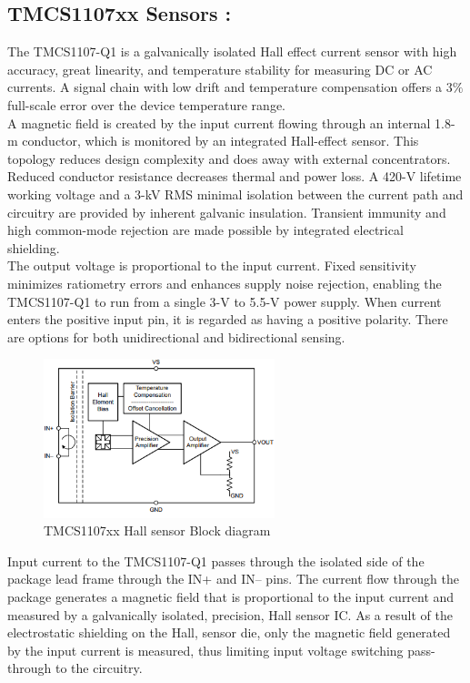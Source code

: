 \subsection{TMCS1107xx Sensors :}
The TMCS1107-Q1 is a galvanically isolated Hall effect current sensor with high accuracy, great linearity, and temperature stability for measuring DC or AC currents. A signal chain with low drift and temperature compensation offers a $3\%$ full-scale error over the device temperature range.\\
A magnetic field is created by the input current flowing through an internal 1.8-m conductor, which is monitored by an integrated Hall-effect sensor. This topology reduces design complexity and does away with external concentrators. Reduced conductor resistance decreases thermal and power loss. A 420-V lifetime working voltage and a 3-kV RMS minimal isolation between the current path and circuitry are provided by inherent galvanic insulation. Transient immunity and high common-mode rejection are made possible by integrated electrical shielding. \\
The output voltage is proportional to the input current. Fixed sensitivity minimizes ratiometry errors and enhances supply noise rejection, enabling the TMCS1107-Q1 to run from a single 3-V to 5.5-V power supply. When current enters the positive input pin, it is regarded as having a positive polarity. There are options for both unidirectional and bidirectional sensing.\\
\begin{figure}[h]
	\centering
	\includegraphics[width=0.6\textwidth]{Chap05/Figures/TMCS1107_HallSensor.PNG}
	\caption{TMCS1107xx Hall sensor Block diagram} 
	\label{fig:TMCS1107xx Hall sensor Block diagram}
\end{figure}
Input current to the TMCS1107-Q1 passes through the isolated side of the package lead frame through the
IN+ and IN– pins. The current flow through the package generates a magnetic field that is proportional to the
input current and measured by a galvanically isolated, precision, Hall sensor IC. As a result of the electrostatic
shielding on the Hall, sensor die, only the magnetic field generated by the input current is measured, thus limiting
input voltage switching pass-through to the circuitry\cite{TI_Hall_Current_Sensing_TMCS1107}.

